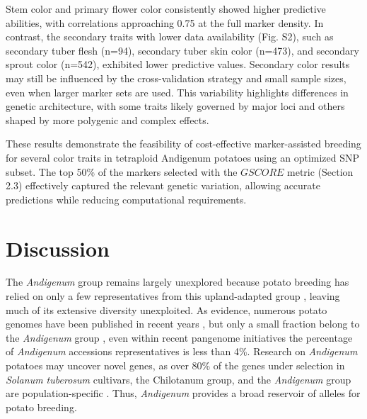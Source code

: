 \documentclass[pdflatex,sn-mathphys-ay]{sn-jnl}%
\begin{document}
Stem color and primary flower color consistently showed higher predictive abilities, with correlations approaching 0.75 at the full marker density. In contrast, the secondary traits with lower data availability (Fig. S2), such as secondary tuber flesh (n=94), secondary tuber skin color (n=473), and secondary sprout color (n=542), exhibited lower predictive values. Secondary color results may still be influenced by the cross-validation strategy and small sample sizes, even when larger marker sets are used. This variability highlights differences in genetic architecture, with some traits likely governed by major loci and others shaped by more polygenic and complex effects.


These results demonstrate the feasibility of cost-effective marker-assisted breeding for several color traits in tetraploid Andigenum potatoes using an optimized SNP subset. The top 50\% of the markers selected with the $GSCORE$ metric (Section 2.3) effectively captured the relevant genetic variation, allowing accurate predictions while reducing computational requirements.







\section{Discussion}



The \textit{Andigenum} group remains largely unexplored \citep{ghislain2020genes} because potato breeding has relied on only a few representatives from this upland-adapted group \citep{spanoghe2022genetic}, leaving much of its extensive diversity unexploited. As evidence, numerous potato genomes have been published in recent years \citep{zhou2020haplotype, campoy2020gamete, sun2022chromosome,  bao2022genome}, but only a small fraction belong to the \textit{Andigenum} group \citep{kanehisa2016blastkoala, diacolg3}, even within recent pangenome initiatives \citep{hoopes2022phased,guo2023pangenome,Bozan2023} the percentage of \textit{Andigenum} accessions representatives is less than 4\%. Research on \textit{Andigenum} potatoes may uncover novel genes, as over 80\% of the genes under selection in \textit{Solanum tuberosum} cultivars, the Chilotanum group, and the \textit{Andigenum} group are population-specific \citep{hardigan2017genome}. Thus, \textit{Andigenum} provides a broad reservoir of alleles for potato breeding. 
\end{document}
